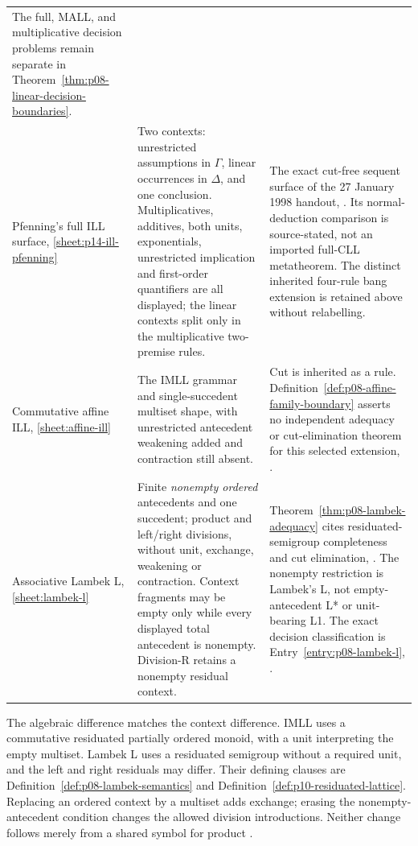\begin{longtable}{@{}p{.18\linewidth}p{.36\linewidth}p{.38\linewidth}@{}}
The full, MALL, and multiplicative decision problems remain separate in
Theorem~\ref{thm:p08-linear-decision-boundaries}. \\
\addlinespace
Pfenning's full ILL surface, \ref{sheet:p14-ill-pfenning} & Two contexts:
unrestricted assumptions in \(\Gamma\), linear occurrences in \(\Delta\),
and one conclusion. Multiplicatives, additives, both units, exponentials,
unrestricted implication and first-order quantifiers are all displayed;
the linear contexts split only in the multiplicative two-premise rules. &
The exact cut-free sequent surface of the 27 January 1998 handout,
\cite[\S2.6]{Pfenning1998ILLSequent}. Its normal-deduction comparison is
source-stated, not an imported full-CLL metatheorem. The distinct inherited
four-rule bang extension is retained above without relabelling. \\
\addlinespace
Commutative affine ILL, \ref{sheet:affine-ill} & The IMLL grammar and
single-succedent multiset shape, with unrestricted antecedent weakening
added and contraction still absent. & Cut is inherited as a rule.
Definition~\ref{def:p08-affine-family-boundary} asserts no independent
adequacy or cut-elimination theorem for this selected extension,
\cite{Lincoln1995}. \\
\addlinespace
Associative Lambek L, \ref{sheet:lambek-l} & Finite \emph{nonempty ordered}
antecedents and one succedent; product and left/right divisions, without
unit, exchange, weakening or contraction. Context fragments may be empty
only while every displayed total antecedent is nonempty. Division-R
retains a nonempty residual context. &
Theorem~\ref{thm:p08-lambek-adequacy} cites residuated-semigroup completeness
and cut elimination, \cite{Buszkowski2010}. The nonempty restriction is
Lambek's L, not empty-antecedent L* or unit-bearing L1. The exact decision
classification is Entry~\ref{entry:p08-lambek-l}, \cite{Pentus2006}. \\
\bottomrule
\end{longtable}\endgroup

The algebraic difference matches the context difference.  IMLL uses a
commutative residuated partially ordered monoid, with a unit interpreting
the empty multiset.  Lambek L uses a residuated semigroup without a required
unit, and the left and right residuals may differ.  Their defining clauses
are Definition~\ref{def:p08-lambek-semantics} and
Definition~\ref{def:p10-residuated-lattice}.  Replacing an ordered context by
a multiset adds exchange; erasing the nonempty-antecedent condition changes
the allowed division introductions.  Neither change follows merely from a
shared symbol for product \cite{Lambek1958,GalatosJipsenKowalskiOno2007}.

